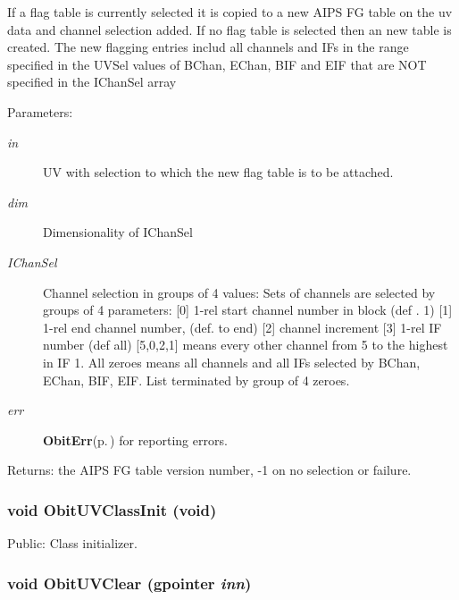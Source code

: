 If a flag table is currently selected it is copied to a new AIPS FG table on the uv data and channel selection added. If no flag table is selected then an new table is created. The new flagging entries includ all channels and IFs in the range specified in the UVSel values of BChan, EChan, BIF and EIF that are NOT specified in the IChan\-Sel array \begin{Desc}
\item[Parameters:]
\begin{description}
\item[{\em in}]UV with selection to which the new flag table is to be attached. \item[{\em dim}]Dimensionality of IChan\-Sel \item[{\em IChan\-Sel}]Channel selection in groups of 4 values: Sets of channels are selected by groups of 4 parameters: [0] 1-rel start channel number in block (def . 1) [1] 1-rel end channel number, (def. to end) [2] channel increment [3] 1-rel IF number (def all) [5,0,2,1] means every other channel from 5 to the highest in IF 1. All zeroes means all channels and all IFs selected by BChan, EChan, BIF, EIF. List terminated by group of 4 zeroes. \item[{\em err}]{\bf Obit\-Err}{\rm (p.\,\pageref{structObitErr})} for reporting errors. \end{description}
\end{Desc}
\begin{Desc}
\item[Returns:]the AIPS FG table version number, -1 on no selection or failure. \end{Desc}
\subsubsection{\setlength{\rightskip}{0pt plus 5cm}void Obit\-UVClass\-Init (void)}\label{ObitUV_8c_a52}


Public: Class initializer. 

\subsubsection{\setlength{\rightskip}{0pt plus 5cm}void Obit\-UVClear (gpointer {\em inn})}\label{ObitUV_8c_a4}


